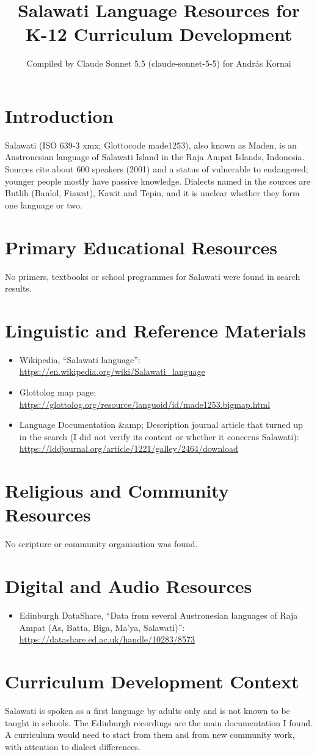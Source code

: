 \documentclass[12pt]{article}
\title{Salawati Language Resources for K-12 Curriculum Development}
\author{Compiled by Claude Sonnet 5.5 (claude-sonnet-5-5) for Andr\'as Kornai}
\date{}
\begin{document}
\maketitle

\section{Introduction}
Salawati (ISO 639-3 xmx; Glottocode made1253), also known as Maden, is an Austronesian language of Salawati Island in the Raja Ampat Islands, Indonesia. Sources cite about 600 speakers (2001) and a status of vulnerable to endangered; younger people mostly have passive knowledge. Dialects named in the sources are Butlih (Banlol, Fiawat), Kawit and Tepin, and it is unclear whether they form one language or two.

\section{Primary Educational Resources}
No primers, textbooks or school programmes for Salawati were found in search results.

\section{Linguistic and Reference Materials}
\begin{itemize}
\item Wikipedia, ``Salawati language'': \url{https://en.wikipedia.org/wiki/Salawati_language}
\item Glottolog map page: \url{https://glottolog.org/resource/languoid/id/made1253.bigmap.html}
\item Language Documentation \&amp; Description journal article that turned up in the search (I did not verify its content or whether it concerns Salawati): \url{https://lddjournal.org/article/1221/galley/2464/download}
\end{itemize}

\section{Religious and Community Resources}
No scripture or community organisation was found.

\section{Digital and Audio Resources}
\begin{itemize}
\item Edinburgh DataShare, ``Data from several Austronesian languages of Raja Ampat (As, Batta, Biga, Ma'ya, Salawati)'': \url{https://datashare.ed.ac.uk/handle/10283/8573}
\end{itemize}

\section{Curriculum Development Context}
Salawati is spoken as a first language by adults only and is not known to be taught in schools. The Edinburgh recordings are the main documentation I found. A curriculum would need to start from them and from new community work, with attention to dialect differences.
\end{document}
